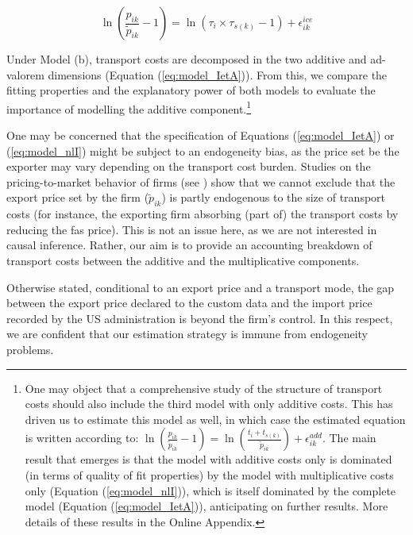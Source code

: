 \documentclass[a4paper,11pt]{article}
\begin{document}
\begin{equation}
\ln\left(\frac{p_{ik}}{\widetilde{p}_{ik}}-1 \right)= \ln \left(\tau_{i}\times\tau_{s(k)}-1 \right) + \epsilon^{ice}_{ik} \label{eq:model_nlI}
\end{equation}

Under Model (b), transport costs are decomposed in the two additive and ad-valorem dimensions (Equation (\ref{eq:model_IetA})).
From this, we compare the fitting properties and the explanatory power of both models to evaluate the importance of modelling the additive component.\footnote{One may object that a comprehensive study of the structure of transport costs should also include the third model with only additive costs.
This has driven us to estimate this model as well, in which case the estimated equation is written according to: $\ln\left(\frac{p_{ik}}{\widetilde{p}_{ik}}-1 \right)= \ln \left(\frac{t_{i} + t_{s(k)}}{\widetilde{p}_{ik}}\right) + \epsilon^{add}_{ik}$.
The main result that emerges is that the model with additive costs only is dominated (in terms of quality of fit properties) by the model with multiplicative costs only (Equation (\ref{eq:model_nlI})), which is itself dominated by the complete model (Equation (\ref{eq:model_IetA})), anticipating on further results.
More details of these results in the Online Appendix.}


One may be concerned that the specification of Equations (\ref{eq:model_IetA}) or (\ref{eq:model_nlI}) might be subject to an endogeneity bias, as the price set be the exporter may vary depending on the transport cost burden.
Studies on the pricing-to-market behavior of firms (see \citealp{Krugman-87}) show that we cannot exclude that the export price set by the firm ($\widetilde{p}_{ik}$) is partly endogenous to the size of transport costs (for instance, the exporting firm absorbing (part of) the transport costs by reducing the fas price).
This is not an issue here, as we are not interested in causal inference.
Rather, our aim is to provide an accounting breakdown of transport costs between the additive and the multiplicative components.

Otherwise stated, conditional to an export price and a transport mode, the gap between the export price declared to the custom data and the import price recorded by the US administration is beyond the firm's control.
In this respect, we are confident that our estimation strategy is immune from endogeneity problems.
\end{document}
